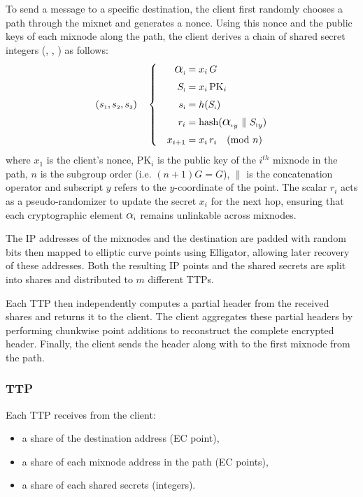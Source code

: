To send a message to a specific destination, the client first randomly chooses a path through the mixnet and generates a nonce.
Using this nonce and the public keys of each mixnode along the path, the client derives a chain of shared secret integers (, , ) as follows:
\begin{equation}
(\s{1}, \s{2}, \s{3}) \quad \left\{ \quad
\begin{aligned}
    \A{i}    &= x_i \, G \\
    \S{i}    &= x_i \, \text{PK}_i \\
    \s{i}    &= h(\S{i}) \\
    r_i      &= \text{hash} ( {\A{i}}_y \ \| \ {\S{i}}_y ) \\
    x_{i+1}  &= x_i \, r_i \quad (\text{mod}\ n)
\end{aligned}
\right.
\label{eq:shared_secret}
\end{equation}
where $ x_1 $ is the client's nonce, $ \text{PK}_i $ is the public key of the $ i^{th} $ mixnode in the path, 
$ n $ is the subgroup order (i.e. $(n+1)G = G$), $ \| $ is  the concatenation operator and subscript $ y $ refers to the $ y $-coordinate of the point.
The scalar $ r_i $ acts as a pseudo-randomizer to update the secret $ x_i $ for the next hop, 
ensuring that each cryptographic element $ \A{i} $ remains unlinkable across mixnodes.

The IP addresses of the mixnodes and the destination are padded with random bits
then mapped to elliptic curve points using Elligator, allowing later recovery of these addresses.
Both the resulting IP points and the shared secrets are split into shares and distributed to $ m $ different TTPs. 

Each TTP then independently computes a partial header from the received shares and returns it to the client. 
The client aggregates these partial headers by performing chunkwise point additions to reconstruct the complete encrypted header.
Finally, the client sends the header along with  to the first mixnode from the path. 

\subsubsection{TTP}
Each TTP receives from the client:
\begin{itemize}
    \item a share of the destination address (EC point),
    \item a share of each mixnode address in the path (EC points),
    \item a share of each shared secrets (integers).
\end{itemize}

